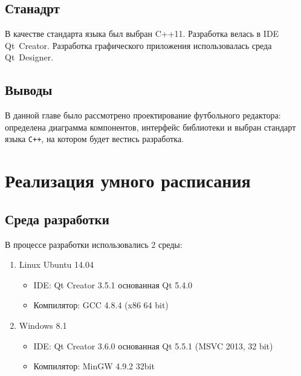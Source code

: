 \subsection{Станадрт}
В качестве стандарта языка был выбран C++11. Разработка велась в IDE Qt~Creator. Разработка графического приложения использовалась среда Qt~Designer.

\subsection{Выводы}
В данной главе было рассмотрено проектирование футбольного редактора: определена диаграмма компонентов, интерфейс библиотеки и выбран стандарт языка \verb|C++|, на котором будет вестись разработка.

\section{Реализация умного расписания}

\subsection{Среда разработки}

В процессе разработки использовались 2 среды:
\begin{enumerate}
\item Linux Ubuntu 14.04
	\begin{itemize}
	\item IDE: Qt Creator 3.5.1 основанная Qt 5.4.0
	\item Компилятор: GCC 4.8.4 (x86 64 bit)
	\end{itemize}
\item Windows 8.1
	\begin{itemize}
	\item IDE: Qt Creator 3.6.0 основанная Qt 5.5.1 (MSVC 2013, 32 bit)
	\item Компилятор: MinGW 4.9.2 32bit
	\end{itemize}
\end{enumerate}

